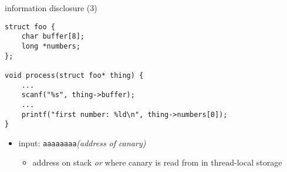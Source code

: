 \begin{frame}[fragile,label=infoDisc3]{information disclosure (3)}
\lstset{
    language=C,
    style=small,
}
\begin{lstlisting}
struct foo {
    char buffer[8];
    long *numbers;
};

void process(struct foo* thing) {
    ...
    scanf("%s", thing->buffer);
    ...
    printf("first number: %ld\n", thing->numbers[0]);
}
\end{lstlisting}
\begin{itemize}
\item input: {\tt aaaaaaaa}\textit{(address of canary)}
    \begin{itemize}
    \item address on stack \textit{or} where canary is read from in thread-local storage
    \end{itemize}
\end{itemize}
\end{frame}

